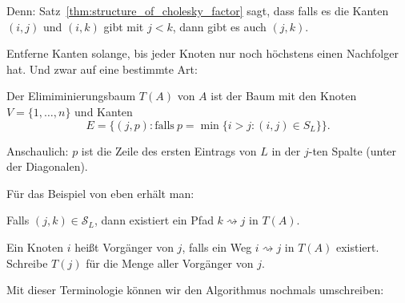 Denn: Satz~\ref{thm:structure_of_cholesky_factor} sagt, dass falls es die Kanten
$(i,j)$ und $(i,k)$ gibt mit $j<k$, dann gibt es auch $(j,k)$.

Entferne Kanten solange, bis jeder Knoten nur noch höchstens einen Nachfolger hat.
Und zwar auf eine bestimmte Art:

\begin{defi}
Der Elimiminierungsbaum $T(A)$ von $A$ ist der Baum mit den Knoten $V = \{1,\ldots,n\}$ und Kanten
\begin{equation*}
 E=\big\lbrace (j,p) \colon \mathrm{falls}\ p=\min \lbrace i > j \colon (i,j) \in S_L \rbrace \big\rbrace.
\end{equation*}
\end{defi}

Anschaulich: $p$ ist die Zeile des ersten Eintrags von $L$ in der $j$-ten Spalte (unter der Diagonalen).

Für das Beispiel von eben erhält man:

\begin{center}
\end{center}

\begin{satz}
\label{thm:ancestors}
Falls $(j,k) \in \mathcal{S}_L$, dann existiert ein Pfad $k \rightsquigarrow j$ in $T(A)$.
\end{satz}

\begin{defi}
Ein Knoten $i$ heißt Vorgänger von $j$, falls ein Weg $i \rightsquigarrow j$ in $T(A)$ existiert.
Schreibe $T(j)$ für die Menge aller Vorgänger von $j$.
\end{defi}

Mit dieser Terminologie können wir den Algorithmus nochmals umschreiben:

